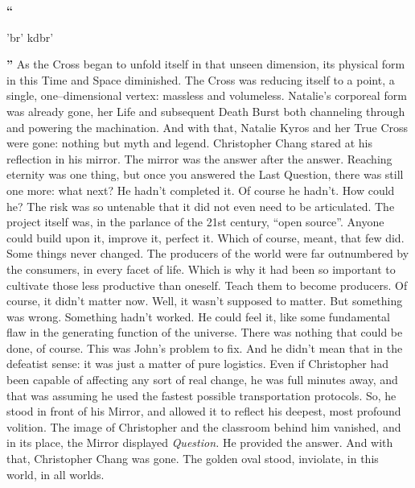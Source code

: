 \SmallVSpace
‎‎\textbf{``}\begin{cjhebrew}'br' kdbr'\end{cjhebrew}\textbf{''}
\SmallVSpace
As the Cross began to unfold itself in that unseen dimension, its physical form in this Time and Space diminished. The Cross was reducing itself to a point, a single, one\mbox{--}dimensional vertex: massless and volumeless. Natalie’s corporeal form was already gone, her Life and subsequent Death Burst both channeling through and powering the machination.
\SomeVSpace
And with that, Natalie Kyros and her True Cross were gone: nothing but myth and legend.
\simpleline
{}
Christopher Chang stared at his reflection in his mirror. The mirror was the answer after the answer. Reaching eternity was one thing, but once you answered the Last Question, there was still one more: what next?
\SmallVSpace
He hadn’t completed it. Of course he hadn’t. How could he? The risk was so untenable that it did not even need to be articulated. The project itself was, in the parlance of the 21st century, “open source”. Anyone could build upon it, improve it, perfect it. Which of course, meant, that few did. Some things never changed. The producers of the world were far outnumbered by the consumers, in every facet of life.
\SmallVSpace
Which is why it had been so important to cultivate those less productive than oneself. Teach them to become producers. Of course, it didn’t matter now. Well, it wasn’t supposed to matter. But something was wrong. Something hadn’t worked. He could feel it, like some fundamental flaw in the generating function of the universe.
\SmallVSpace
There was nothing that could be done, of course. This was John’s problem to fix. And he didn’t mean that in the defeatist sense: it was just a matter of pure logistics. Even if Christopher had been capable of affecting any sort of real change, he was full minutes away, and that was assuming he used the fastest possible transportation protocols.
\SmallVSpace
So, he stood in front of his Mirror, and allowed it to reflect his deepest, most profound volition. The image of Christopher and the classroom behind him vanished, and in its place, the Mirror displayed \emph{Question.}
\SmallVSpace
He provided the answer. And with that, Christopher Chang was gone.
\SomeVSpace
The golden oval stood, inviolate, in this world, in all worlds.
\simpleline
{}

